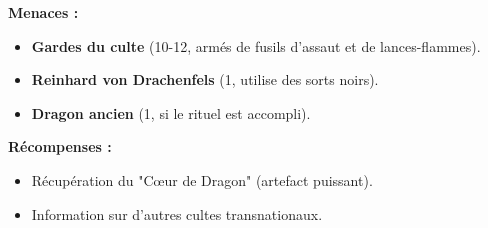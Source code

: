 \documentclass[10pt,a5paper,twoside]{book}
\begin{document}
\begin{shaded}
\textbf{Menaces :}
	\begin{itemize}
		\item \textbf{Gardes du culte} (10-12, armés de fusils d'assaut et de lances-flammes).
		\item \textbf{Reinhard von Drachenfels} (1, utilise des sorts noirs).
		\item \textbf{Dragon ancien} (1, si le rituel est accompli).
	\end{itemize}

\textbf{Récompenses :}
	\begin{itemize}
		\item Récupération du "Cœur de Dragon" (artefact puissant).
		\item Information sur d'autres cultes transnationaux.
	\end{itemize}
\end{shaded}

\newpage
\end{document}
